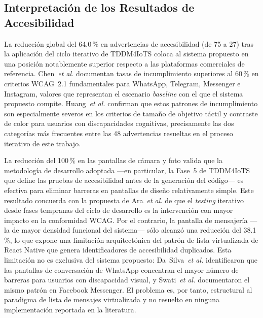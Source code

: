 \documentclass[journal]{IEEEtran}
\begin{document}
		\subsection{Interpretaci\'on de los Resultados de Accesibilidad}
			La reducci\'on global del 64.0\,\% en advertencias de accesibilidad (de 75 a 27) tras la aplicaci\'on del ciclo iterativo de TDDM4IoTS coloca al sistema propuesto en una posici\'on notablemente superior respecto a las plataformas comerciales de referencia. Chen~\textit{et al.} \cite{chen2022} documentan tasas de incumplimiento superiores al 60\,\% en criterios WCAG~2.1 fundamentales para WhatsApp, Telegram, Messenger e Instagram, valores que representan el escenario \textit{baseline} con el que el sistema propuesto compite. Huang~\textit{et al.} \cite{huang2025} confirman que estos patrones de incumplimiento son especialmente severos en los criterios de tama\~no de objetivo t\'actil y contraste de color para usuarios con discapacidades cognitivas, precisamente las dos categor\'ias m\'as frecuentes entre las 48 advertencias resueltas en el proceso iterativo de este trabajo.
			
			La reducci\'on del 100\,\% en las pantallas de c\'amara y foto valida que la metodolog\'ia de desarrollo adoptada ---en particular, la Fase~5 de TDDM4IoTS que define las pruebas de accesibilidad antes de la generaci\'on del c\'odigo--- es efectiva para eliminar barreras en pantallas de dise\~no relativamente simple. Este resultado concuerda con la propuesta de Ara~\textit{et al.} \cite{ara2024} de que el \textit{testing} iterativo desde fases tempranas del ciclo de desarrollo es la intervenci\'on con mayor impacto en la conformidad WCAG. Por el contrario, la pantalla de mensajer\'ia ---la de mayor densidad funcional del sistema--- s\'olo alcanz\'o una reducci\'on del 38.1\,\%, lo que expone una limitaci\'on arquitect\'onica del patr\'on de lista virtualizada de React Native que genera identificadores de accesibilidad duplicados. Esta limitaci\'on no es exclusiva del sistema propuesto: Da~Silva~\textit{et al.} \cite{dasilva2016} identificaron que las pantallas de conversaci\'on de WhatsApp concentran el mayor n\'umero de barreras para usuarios con discapacidad visual, y Swati~\textit{et al.} \cite{swati2021} documentaron el mismo patr\'on en Facebook Messenger. El problema es, por tanto, estructural al paradigma de lista de mensajes virtualizada y no resuelto en ninguna implementaci\'on reportada en la literatura.
			
\end{document}
